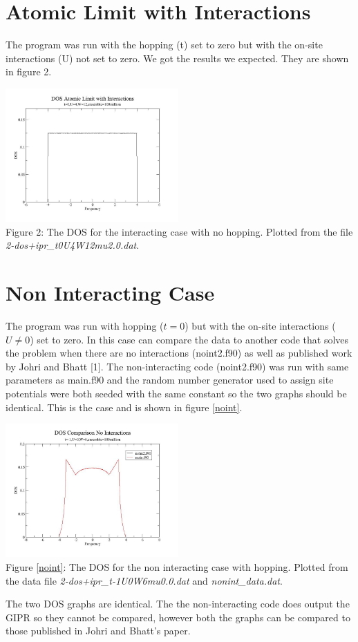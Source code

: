 \documentclass{article}
\begin{document}
\section{Atomic Limit with Interactions}
The program was run with the hopping (t) set to zero but with the on-site interactions (U) not set to zero. We got the results we expected. They are shown in figure 2.

\begin{center}
	\includegraphics[width=250px]{dos2_t0u4w12.jpg} \\
	Figure 2: The DOS for the interacting case with no hopping. Plotted from the file \textit{2-dos+ipr\_t0U4W12mu2.0.dat}.
\end{center}

\section{Non Interacting Case}
The program was run with hopping ($t=0$) but with the on-site interactions ($U\ne0$) set to zero. In this case can compare the data to another code that solves the problem when there are no interactions (noint2.f90) as well as published work by Johri and Bhatt [1]. The non-interacting code (noint2.f90) was run with same parameters as main.f90 and the random number generator used to assign site potentials were both seeded with the same constant so the two graphs should be identical. This is the case and is shown in figure \ref{noint}.
\begin{center} 
	\includegraphics[width=250px]{dos_compareu0.jpg} \\ \label{noint}
	Figure \ref{noint}: The DOS for the non interacting case with hopping. Plotted from the data file \textit{2-dos+ipr\_t-1U0W6mu0.0.dat} and \textit{nonint\_data.dat}.
\end{center}
The two DOS graphs are identical. The the non-interacting code does output the GIPR so they cannot be compared, however both the graphs can be compared to those published in Johri and Bhatt's paper. 
\end{document}
